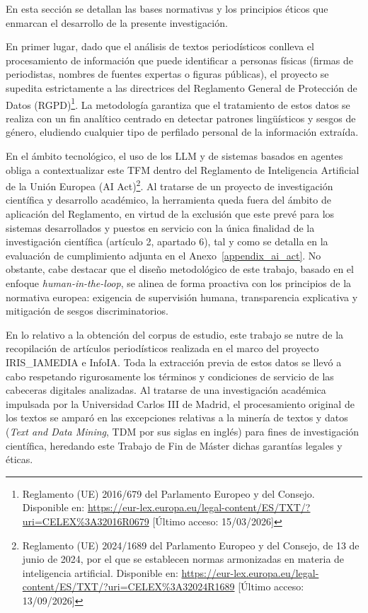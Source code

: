 
En esta sección se detallan las bases normativas y los principios éticos que enmarcan el desarrollo de la presente investigación.

En primer lugar, dado que el análisis de textos periodísticos conlleva el procesamiento de información que puede identificar a personas físicas (firmas de periodistas, nombres de fuentes expertas o figuras públicas), el proyecto se supedita estrictamente a las directrices del Reglamento General de Protección de Datos (RGPD)\footnote{Reglamento (UE) 2016/679 del Parlamento Europeo y del Consejo. Disponible en: \url{https://eur-lex.europa.eu/legal-content/ES/TXT/?uri=CELEX\%3A32016R0679} [Último acceso: 15/03/2026]}. La metodología garantiza que el tratamiento de estos datos se realiza con un fin analítico centrado en detectar patrones lingüísticos y sesgos de género, eludiendo cualquier tipo de perfilado personal de la información extraída.

En el ámbito tecnológico, el uso de los LLM y de sistemas basados en agentes obliga a contextualizar este TFM dentro del Reglamento de Inteligencia Artificial de la Unión Europea (AI Act)\footnote{Reglamento (UE) 2024/1689 del Parlamento Europeo y del Consejo, de 13 de junio de 2024, por el que se establecen normas armonizadas en materia de inteligencia artificial. Disponible en: \url{https://eur-lex.europa.eu/legal-content/ES/TXT/?uri=CELEX\%3A32024R1689} [Último acceso: 13/09/2026]}. Al tratarse de un proyecto de investigación científica y desarrollo académico, la herramienta queda fuera del ámbito de aplicación del Reglamento, en virtud de la exclusión que este prevé para los sistemas desarrollados y puestos en servicio con la única finalidad de la investigación científica (artículo 2, apartado 6), tal y como se detalla en la evaluación de cumplimiento adjunta en el Anexo~\ref{appendix_ai_act}. No obstante, cabe destacar que el diseño metodológico de este trabajo, basado en el enfoque \textit{human-in-the-loop}, se alinea de forma proactiva con los principios de la normativa europea: exigencia de supervisión humana, transparencia explicativa y mitigación de sesgos discriminatorios.

En lo relativo a la obtención del corpus de estudio, este trabajo se nutre de la recopilación de artículos periodísticos realizada en el marco del proyecto IRIS\_IAMEDIA e InfoIA. Toda la extracción previa de estos datos se llevó a cabo respetando rigurosamente los términos y condiciones de servicio de las cabeceras digitales analizadas. Al tratarse de una investigación académica impulsada por la Universidad Carlos III de Madrid, el procesamiento original de los textos se amparó en las excepciones relativas a la minería de textos y datos (\textit{Text and Data Mining}, TDM por sus siglas en inglés) para fines de investigación científica, heredando este Trabajo de Fin de Máster dichas garantías legales y éticas.

